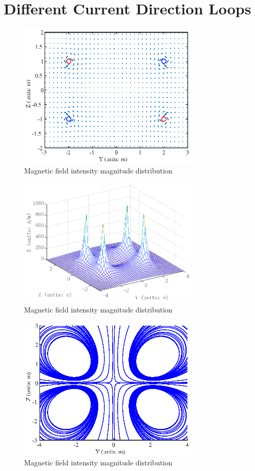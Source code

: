 \documentclass[10pt, journal, final]{IEEEtran}
\begin{document}
\section{
  Different Current Direction Loops
 }
\label{sec: Diff Direction}



\begin{figure}[htbp]
    \centering
    \includegraphics[width = 3.4in]{figures/work2.1.eps}
    \caption{Magnetic field intensity magnitude distribution}
    \label{fig:2.1}
\end{figure}

\begin{figure}[htbp]
    \centering
    \includegraphics[width = 3.4in]{figures/work2.2.eps}
    \caption{Magnetic field intensity magnitude distribution}
    \label{fig:2.2}
\end{figure}

\begin{figure}[htbp]
    \centering
    \includegraphics[width = 3.4in]{figures/work2.3.eps}
    \caption{Magnetic field intensity magnitude distribution}
    \label{fig:2.3}
\end{figure}
\end{document}

